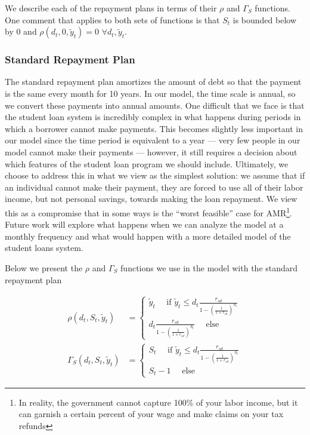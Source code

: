   We describe each of the repayment plans in terms of their $\rho$ and $\Gamma_S$ functions. One
  comment that applies to both sets of functions is that $S_t$ is bounded below by 0 and
  $\rho(d_t, 0, \tilde{y}_t) = 0$ $\forall d_t, \tilde{y}_t$.


  \subsubsection{Standard Repayment Plan} \label{subsubsec:amr}

    The standard repayment plan amortizes the amount of debt so that the payment is the same every
    month for 10 years. In our model, the time scale is annual, so we convert these payments into
    annual amounts. One difficult that we face is that the student loan system is incredibly complex
    in what happens during periods in which a borrower cannot make payments. This becomes slightly
    less important in our model since the time period is equivalent to a year --- very few people in
    our model cannot make their payments --- however, it still requires a decision about which
    features of the student loan program we should include. Ultimately, we choose to address this in
    what we view as the simplest solution: we assume that if an individual cannot make their
    payment, they are forced to use all of their labor income, but not personal savings, towards
    making the loan repayment. We view this as a compromise that in some ways is the ``worst
    feasible'' case for AMR\footnote{In reality, the government cannot capture 100\% of your labor
    income, but it can garnish a certain percent of your wage and make claims on your tax refunds}.
    Future work will explore what happens when we can analyze the model at a monthly frequency and
    what would happen with a more detailed model of the student loans system.

    Below we present the $\rho$ and $\Gamma_S$ functions we use in the model with the standard
    repayment plan

    \begin{align*}
      \rho(d_t, S_t, \tilde{y}_t) &=
        \begin{cases}
          \tilde{y}_t \quad\text{ if } \tilde{y}_t \leq d_t \frac{r_{sd}}{1 - \left(\frac{1}{1 + r_{sd}} \right)^{S_t}} \\
          d_t \frac{r_{sd}}{1 - \left(\frac{1}{1 + r_{sd}} \right)^{S_t}} \quad\text{ else }
        \end{cases} \\
      \Gamma_S(d_t, S_t, \tilde{y}_t) &=
        \begin{cases}
          S_t \quad\text{ if } \tilde{y}_t \leq d_t \frac{r_{sd}}{1 - \left(\frac{1}{1 + r_{sd}} \right)^{S_t}} \\
          S_t - 1 \quad\text{ else }
        \end{cases}
    \end{align*}


